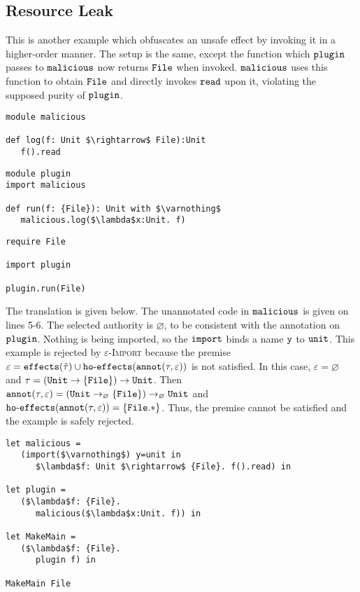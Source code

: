 \subsection{Resource Leak}

This is another example which obfuscates an unsafe effect by invoking it in a higher-order manner. The setup is the same, except the function which $\mathtt{plugin}$ passes to $\mathtt{malicious}$ now returns $\mathtt{File}$ when invoked. $\mathtt{malicious}$ uses this function to obtain $\mathtt{File}$ and directly invokes $\mathtt{read}$ upon it, violating the supposed purity of $\mathtt{plugin}$.

\begin{lstlisting}
module malicious

def log(f: Unit $\rightarrow$ File):Unit
   f().read
\end{lstlisting}

\begin{lstlisting}
module plugin
import malicious

def run(f: {File}): Unit with $\varnothing$
   malicious.log($\lambda$x:Unit. f)
\end{lstlisting}

\begin{lstlisting}
require File

import plugin

plugin.run(File)
\end{lstlisting}

The translation is given below. The unannotated code in $\mathtt{malicious}$ is given on lines 5-6. The selected authority is $\varnothing$, to be consistent with the annotation on $\mathtt{plugin}$. Nothing is being imported, so the $\mathtt{import}$ binds a name $\mathtt{y}$ to $\mathtt{unit}$. This example is rejected by \textsc{$\varepsilon$-Import} because the premise $\varepsilon = \mathtt{effects}(\hat \tau) \cup \mathtt{ho \hbox{-} effects}(\mathtt{annot}(\tau, \varepsilon))$ is not satisfied. In this case, $\varepsilon = \varnothing$ and $\tau = \mathtt{ (Unit \rightarrow \{ File \}) \rightarrow Unit }$. Then $\mathtt{annot}(\tau, \varepsilon) = \mathtt{ (Unit \rightarrow_{\varnothing} \{ File \}) \rightarrow_{\varnothing} Unit }$ and $\mathtt{ho \hbox{-} effects}(\mathtt{annot}(\tau, \varepsilon)) = \{ \mathtt{File.*} \}$. Thus, the premise cannot be satisfied and the example is safely rejected.


\begin{lstlisting}
let malicious =
   (import($\varnothing$) y=unit in
      $\lambda$f: Unit $\rightarrow$ {File}. f().read) in

let plugin =
   ($\lambda$f: {File}.
      malicious($\lambda$x:Unit. f)) in

let MakeMain =
   ($\lambda$f: {File}.
      plugin f) in

MakeMain File
\end{lstlisting}